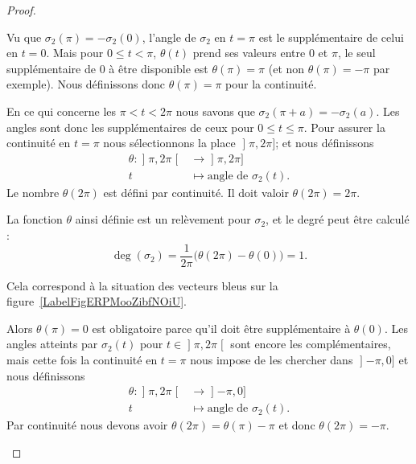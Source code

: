 \begin{proof}
\begin{subproof}
\begin{subproof}
			Vu que \( \sigma_2(\pi)=-\sigma_2(0)\), l'angle de \( \sigma_2\) en \( t=\pi\) est le supplémentaire de celui en \( t=0\). Mais pour \( 0\leq t<\pi\), \( \theta(t)\) prend ses valeurs entre \( 0\) et \( \pi\), le seul supplémentaire de \( 0\) à être disponible est \( \theta(\pi)=\pi\) (et non \( \theta(\pi)=-\pi\) par exemple). Nous définissons donc \( \theta(\pi)=\pi\) pour la continuité.

			En ce qui concerne les \( \pi<t< 2\pi\) nous savons que \( \sigma_2(\pi+a)=-\sigma_2(a)\). Les angles sont donc les supplémentaires de ceux pour \( 0\leq t\leq \pi\). Pour assurer la continuité en \( t=\pi\) nous sélectionnons la place \( \mathopen] \pi , 2\pi \mathclose]\); et nous définissons
			\begin{equation}
				\begin{aligned}
					\theta\colon \mathopen] \pi , 2\pi \mathclose[ & \to \mathopen] \pi , 2\pi \mathclose] \\
					t                                              & \mapsto \text{angle de } \sigma_2(t).
				\end{aligned}
			\end{equation}
			Le nombre \( \theta(2\pi)\) est défini par continuité. Il doit valoir \( \theta(2\pi)=2\pi\).

			La fonction \( \theta\) ainsi définie est un relèvement pour \( \sigma_2\), et le degré peut être calculé :
			\begin{equation}
				\deg(\sigma_2)=\frac{1}{ 2\pi }\big( \theta(2\pi)-\theta(0) \big)=1.
			\end{equation}

			\newcommand{\CaptionFigERPMooZibfNOiU}{Les vecteurs représenant \( \sigma_2\) dans le cas où \( \beta'(0)\) est dans le sens de \( \ell_p\) ou dans le sens inverse. Pour le sport nous avons dessiné la situation avec une droite \( \ell\) quelconque plutôt que horizontale.}
			

			\spitem[Si \( \theta(0)=\pi\)]
			Cela correspond à la situation des vecteurs bleus sur la figure~\ref{LabelFigERPMooZibfNOiU}.

			Alors \( \theta(\pi)=0\) est obligatoire parce qu'il doit être supplémentaire à \( \theta(0)\). Les angles atteints par \( \sigma_2(t)\) pour \( t\in\mathopen] \pi , 2\pi \mathclose[ \) sont encore les complémentaires, mais cette fois la continuité en \( t=\pi\) nous impose de les chercher dans \( \mathopen] -\pi , 0 \mathclose]\) et nous définissons
			\begin{equation}
				\begin{aligned}
					\theta\colon \mathopen] \pi , 2\pi \mathclose[ & \to \mathopen] -\pi , 0 \mathclose]   \\
					t                                              & \mapsto \text{angle de } \sigma_2(t).
				\end{aligned}
			\end{equation}
			Par continuité nous devons avoir \( \theta(2\pi)=\theta(\pi)-\pi\) et donc \( \theta(2\pi)=-\pi\).


\end{subproof}
\end{subproof}
\end{proof}
